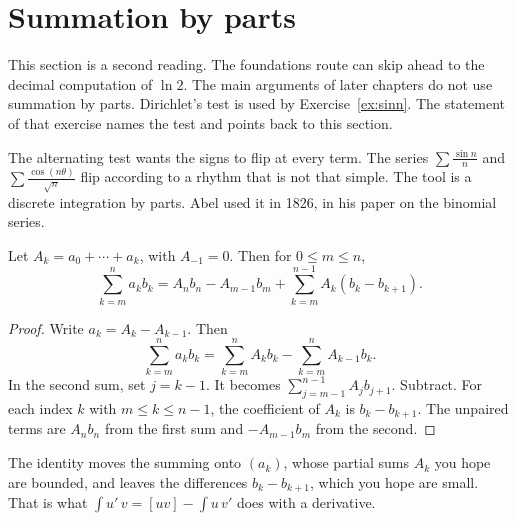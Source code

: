 \section{Summation by parts}

This section is a second reading. The foundations route can skip ahead to the decimal computation of $\ln 2$. The main arguments of later chapters do not use summation by parts. Dirichlet's test is used by Exercise~\ref{ex:sinn}. The statement of that exercise names the test and points back to this section.

The alternating test wants the signs to flip at every term. The series $\sum\frac{\sin n}n$ and $\sum\frac{\cos(n\theta)}{\sqrt n}$ flip according to a rhythm that is not that simple. The tool is a discrete integration by parts. Abel used it in 1826, in his paper on the binomial series.


\begin{proposition}\label{prop:abelsum}
Let $A_k=a_0+\cdots+a_k$, with $A_{-1}=0$. Then for $0\le m\le n$,
\[
\sum_{k=m}^n a_kb_k=A_nb_n-A_{m-1}b_m+\sum_{k=m}^{n-1}A_k(b_k-b_{k+1}).
\]
\end{proposition}
\begin{proof}
Write $a_k=A_k-A_{k-1}$. Then
\[
\sum_{k=m}^n a_kb_k=\sum_{k=m}^n A_kb_k-\sum_{k=m}^n A_{k-1}b_k.
\]
In the second sum, set $j=k-1$. It becomes $\sum_{j=m-1}^{n-1}A_jb_{j+1}$. Subtract. For each index $k$ with $m\le k\le n-1$, the coefficient of $A_k$ is $b_k-b_{k+1}$. The unpaired terms are $A_nb_n$ from the first sum and $-A_{m-1}b_m$ from the second.
\end{proof}

The identity moves the summing onto $(a_k)$, whose partial sums $A_k$ you hope are bounded, and leaves the differences $b_k-b_{k+1}$, which you hope are small. That is what $\int u'\,v=[uv]-\int u\,v'$ does with a derivative.

